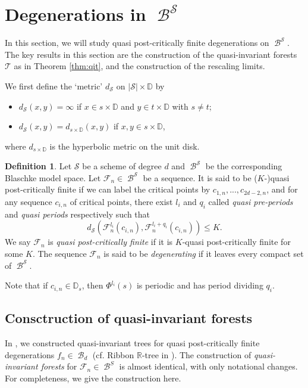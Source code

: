 \documentclass[11pt, reqno]{amsart}
\numberwithin{equation}{section}
\theoremstyle{plain}
\theoremstyle{theorem}
\theoremstyle{definition}
\newtheorem{defn}[theorem]{Definition}
\newcommand{\R}{\mathbb{R}}
\newcommand{\D}{\mathbb{D}}
\newcommand{\bp}{\mathcal{F}}
\DeclareMathOperator{\BP}{\mathcal{B}}
\numberwithin{figure}{section}
\begin{document}
\section{Degenerations in $\BP^\mathcal{S}$}\label{sec:DBS}
In this section, we will study quasi post-critically finite degenerations on $\BP^\mathcal{S}$.
The key results in this section are the construction of the quasi-invariant forests $\mathcal{T}$ as in Theorem \ref{thm:qit}, and the construction of the rescaling limits.

We first define the `metric' $d_{\mathcal{S}}$ on $|\mathcal{S}| \times \D$ by
\begin{itemize}
\item $d_{\mathcal{S}}(x,y) = \infty$ if $x \in s\times \D$ and $y\in t\times\D$ with $s \neq t$;
\item $d_{\mathcal{S}}(x,y) = d_{s\times \D}(x, y)$ if $x, y\in s\times \D$,
\end{itemize}
where $d_{s\times \D}$ is the hyperbolic metric on the unit disk.

\begin{defn}\label{defn:qpcfbm}
Let $\mathcal{S}$ be a scheme of degree $d$ and $\BP^\mathcal{S}$ be the corresponding Blaschke model space.
Let $\bp_n \in \BP^\mathcal{S}$ be a sequence.
It is said to be ($K$-)quasi post-critically finite if we can label the critical points by $c_{1,n},..., c_{2d-2, n}$, and for any sequence $c_{i,n}$ of critical points, there exist $l_i$ and $q_i$ called {\em quasi pre-periods} and {\em quasi periods} respectively such that
$$
d_{\mathcal{S}}(\bp_n^{l_i}(c_{i,n}), \bp_n^{l_i+q_i}(c_{i,n})) \leq K.
$$
We say $\bp_n$ is {\em quasi post-critically finite} if it is $K$-quasi post-critically finite for some $K$.
The sequence $\bp_n$ is said to be {\em degenerating} if it leaves every compact set of $\BP^\mathcal{S}$.
\end{defn}
Note that if $c_{i, n} \in \D_s$, then $\Phi^{l_i}(s)$ is periodic and has period dividing $q_i$.

\subsection{Consctruction of quasi-invariant forests}
In \cite{Luo21}, we constructed quasi-invariant trees for quasi post-critically finite degenerations $f_n \in \BP_d$ (cf. Ribbon $\R$-tree in \cite{McM09}).
The construction of {\em quasi-invariant forests} for $\bp_n \in \BP^S$ is almost identical, with only notational changes.
For completeness, we give the construction here.
\end{document}
